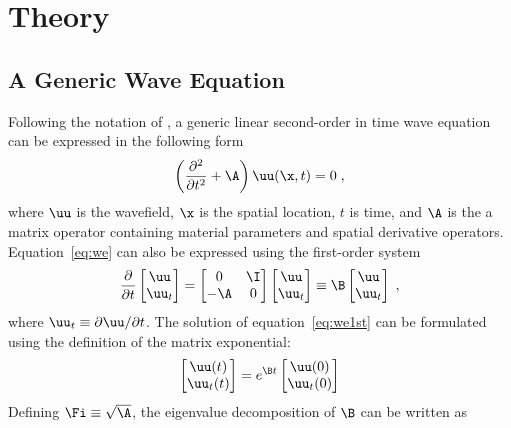 \section{Theory}

\subsection{A Generic Wave Equation}
Following the notation of \cite{rite}, a generic linear second-order in time wave equation can be expressed in the following form
\begin{equation}
\label{eq:we}
\left( \frac{\partial^2}{\partial t^2} + \A \right) \uu(\x,t) = 0 \;,
\end{equation}
where $\uu$ is the wavefield, $\x$ is the spatial location, $t$ is time, and $\A$ is the a matrix operator containing material parameters and spatial derivative operators. Equation~\ref{eq:we} can also be expressed using the first-order system
\begin{equation}
\label{eq:we1st}
\frac{\partial}{\partial t} \begin{bmatrix}   \uu \\ \uu_t \end{bmatrix} 
= \begin{bmatrix}   0 & \I \\ -\A & 0 \end{bmatrix} \begin{bmatrix}   \uu \\ \uu_t \end{bmatrix} \equiv \B \begin{bmatrix}   \uu \\ \uu_t \end{bmatrix} \;,
\end{equation}
where $\uu_t \equiv \partial \uu/\partial t$. The solution of equation~\ref{eq:we1st} can be formulated using the definition of the matrix exponential:
\begin{equation}
\label{eq:sol-we1st}
\begin{bmatrix}   \uu(t) \\ \uu_t(t) \end{bmatrix} = e^{\B t} \begin{bmatrix}   \uu(0) \\ \uu_t(0) \end{bmatrix}
\end{equation}
Defining $\Fi \equiv \sqrt{\A}$, the eigenvalue decomposition of $\B$ can be written as \cite[]{rite}
